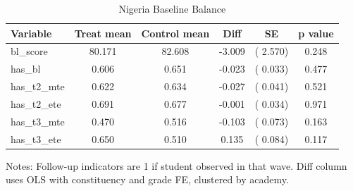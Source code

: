 \begin{table}[!htbp]
\centering
\caption{Nigeria Baseline Balance}
\label{tab:ng_balance}
\begin{threeparttable}
\begin{tabular}[t]{lccccc}
\toprule
Variable & Treat mean & Control mean & Diff & SE & p value \\
\midrule
bl\_score &  80.171 &  82.608 &  -3.009 & (  2.570) & 0.248 \\
has\_bl &   0.606 &   0.651 &  -0.023 & (  0.033) & 0.477 \\
has\_t2\_mte &   0.622 &   0.634 &  -0.027 & (  0.041) & 0.521 \\
has\_t2\_ete &   0.691 &   0.677 &  -0.001 & (  0.034) & 0.971 \\
has\_t3\_mte &   0.470 &   0.516 &  -0.103 & (  0.073) & 0.163 \\
has\_t3\_ete &   0.650 &   0.510 &   0.135 & (  0.084) & 0.117 \\
\bottomrule
\end{tabular}
\begin{tablenotes}[para]
\item Notes: Follow-up indicators are 1 if student observed in that wave.
Diff column uses OLS with constituency and grade FE, clustered by academy.
\end{tablenotes}
\end{threeparttable}
\end{table}
